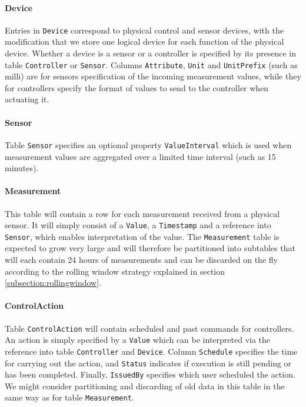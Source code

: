 \paragraph{Device} 
Entries in \texttt{Device} correspond to physical control and sensor devices, with the modification that we store one logical device for each function of the physical device. Whether a device is a sensor or a controller is specified by its presence in table \texttt{Controller} or \texttt{Sensor}. Columns \texttt{Attribute}, \texttt{Unit} and \texttt{UnitPrefix} (such as milli) are for sensors specification of the incoming measurement values, while they for controllers specify the format of values to send to the controller when actuating it.

\paragraph{Sensor} 
Table \texttt{Sensor} specifies an optional property \texttt{ValueInterval} which is used when measurement values are aggregated over a limited time interval (such as 15 minutes). 

\paragraph{Measurement} 
This table will contain a row for each measurement received from a physical sensor. It will simply consist of a \texttt{Value}, a \texttt{Timestamp} and a reference into \texttt{Sensor}, which enables interpretation of the value. The \texttt{Measurement} table is expected to grow very large and will therefore be partitioned into subtables that will each contain 24 hours of measurements and can be discarded on the fly according to the rolling window strategy explained in section \ref{subsection:rollingwindow}.

\paragraph{ControlAction} 
Table \texttt{ControlAction} will contain scheduled and past commands for controllers. An action is simply specified by a \texttt{Value} which can be interpreted via the reference into table \texttt{Controller} and \texttt{Device}. Column \texttt{Schedule} specifies the time for carrying out the action, and \texttt{Status} indicates if execution is still pending or has been completed. Finally, \texttt{IssuedBy} specifies which user scheduled the action. We might consider partitioning and discarding of old data in this table in the same way as for table \texttt{Measurement}.

